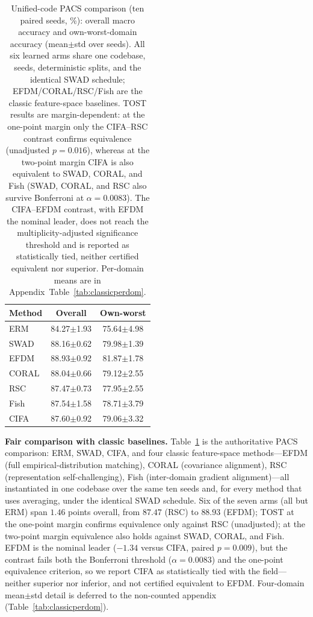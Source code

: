 \documentclass[electronics,article,submit,moreauthors]{Definitions/mdpi}
\begin{document}
\begin{table}[t]
\centering
\caption{Unified-code PACS comparison (ten paired seeds, \%): overall macro accuracy and own-worst-domain accuracy (mean$\pm$std over seeds). All six learned arms share one codebase, seeds, deterministic splits, and the identical SWAD schedule; EFDM/CORAL/RSC/Fish are the classic feature-space baselines. TOST results are margin-dependent: at the one-point margin only the CIFA--RSC contrast confirms equivalence (unadjusted $p=0.016$), whereas at the two-point margin CIFA is also equivalent to SWAD, CORAL, and Fish (SWAD, CORAL, and RSC also survive Bonferroni at $\alpha=0.0083$). The CIFA--EFDM contrast, with EFDM the nominal leader, does not reach the multiplicity-adjusted significance threshold and is reported as statistically tied, neither certified equivalent nor superior. Per-domain means are in Appendix~Table~\ref{tab:classicperdom}.}
\label{tab:classic}
\setlength{\tabcolsep}{5pt}
\begin{tabular}{lcc}
\toprule
\textbf{Method} & \textbf{Overall} & \textbf{Own-worst}\\
\midrule
ERM   & 84.27$\pm$1.93 & 75.64$\pm$4.98 \\
SWAD  & 88.16$\pm$0.62 & 79.98$\pm$1.39 \\
EFDM  & 88.93$\pm$0.92 & 81.87$\pm$1.78 \\
CORAL & 88.04$\pm$0.66 & 79.12$\pm$2.55 \\
RSC   & 87.47$\pm$0.73 & 77.95$\pm$2.55 \\
Fish  & 87.54$\pm$1.58 & 78.71$\pm$3.79 \\
CIFA  & 87.60$\pm$0.92 & 79.06$\pm$3.32 \\
\bottomrule
\end{tabular}
\end{table}

\textbf{Fair comparison with classic baselines.} Table~\ref{tab:classic} is the authoritative PACS comparison: ERM, SWAD, CIFA, and four classic feature-space methods---EFDM (full empirical-distribution matching), CORAL (covariance alignment), RSC (representation self-challenging), Fish (inter-domain gradient alignment)---all instantiated in one codebase over the same ten seeds and, for every method that uses averaging, under the identical SWAD schedule. Six of the seven arms (all but ERM) span $1.46$ points overall, from $87.47$ (RSC) to $88.93$ (EFDM); TOST at the one-point margin confirms equivalence only against RSC (unadjusted); at the two-point margin equivalence also holds against SWAD, CORAL, and Fish. EFDM is the nominal leader ($-1.34$ versus CIFA, paired $p=0.009$), but the contrast fails both the Bonferroni threshold ($\alpha=0.0083$) and the one-point equivalence criterion, so we report CIFA as statistically tied with the field---neither superior nor inferior, and not certified equivalent to EFDM. Four-domain mean$\pm$std detail is deferred to the non-counted appendix (Table~\ref{tab:classicperdom}).
\end{document}

